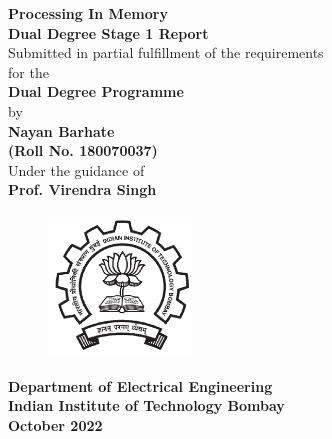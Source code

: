 \documentclass[a4paper,12pt, final]{report}
\begin{document}
  \thispagestyle{empty}
  \vspace*{1cm}
  {\centering     
  \textbf{\LARGE Processing In Memory}\\
  \vspace{1.20cm}
  \textbf{\large Dual Degree Stage 1 Report}\\
  \vspace{1cm}
  {Submitted in partial fulfillment of the requirements}\\
  \vspace{0.25cm}
  {for the }\\
  \vspace{1cm}
  \textbf{ Dual Degree Programme}\\
  \vspace{1.50cm}
  {by}\\
  \vspace{0.20cm}
  \textbf{\large Nayan Barhate}\\
  \vspace{0.25cm}
  \textbf{\large (Roll No. 180070037)}\\
  \vspace{1.8cm}
  {Under the guidance of}\\
  \vspace{0.20cm}
  \textbf{\large Prof. Virendra Singh}\\
    \vspace{0.30cm}
  \vspace{1.450cm}
    \begin{figure}[htb]
    \begin{center}
    \includegraphics[height=1.5in,width=1.5in]{iitblogo.png}
    \end{center}
    \end{figure}

    
  {\textbf{Department of Electrical Engineering}}\\
  {\textbf{Indian Institute of Technology Bombay}}\\
  {\textbf{October 2022}}
 
 }
 
\end{document}
